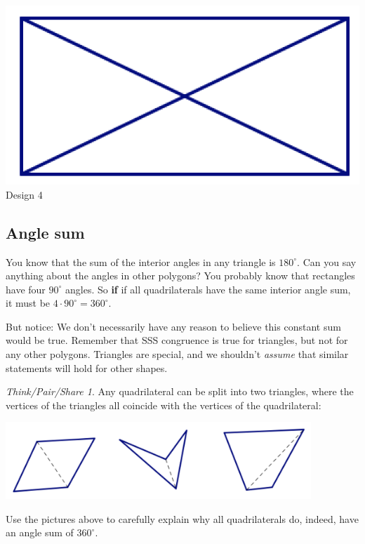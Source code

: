 \documentclass[12pt, reqno]{amsart}
\theoremstyle{remark}
\newtheorem*{thinkpair*}{Think/Pair/Share}
\theoremstyle{definition}
\numberwithin{equation}{section}  %
\begin{document}
\begin{center}
\bigskip

\includegraphics[scale=0.6]{design4} \\
Design 4


\end{center}

\newpage

\subsection{Angle sum}
You know that the sum of the interior angles in any triangle is $180^\circ$.  Can you say anything about the angles in other polygons?  
You probably know that rectangles have four $90^\circ$ angles.  So {\bf if} if all quadrilaterals have the same interior angle sum, it must be $4 \cdot 90^\circ = 360^\circ$.  

But notice: We don't necessarily have any reason to believe this constant sum would be true.  Remember that SSS congruence is true for triangles, but not for any other polygons.  Triangles are special, and we shouldn't \emph{assume} that similar statements will hold for other shapes.


\bigskip
\bigskip

\begin{thinkpair*}
Any quadrilateral can be split into two triangles, where the vertices of the triangles all coincide with the vertices of the quadrilateral:

\begin{center}
\includegraphics[height=2.9cm]{splitquads}
\end{center}
Use the pictures above to carefully explain why all quadrilaterals do, indeed, have an angle sum of $360^\circ$.

\end{thinkpair*}
\end{document}
